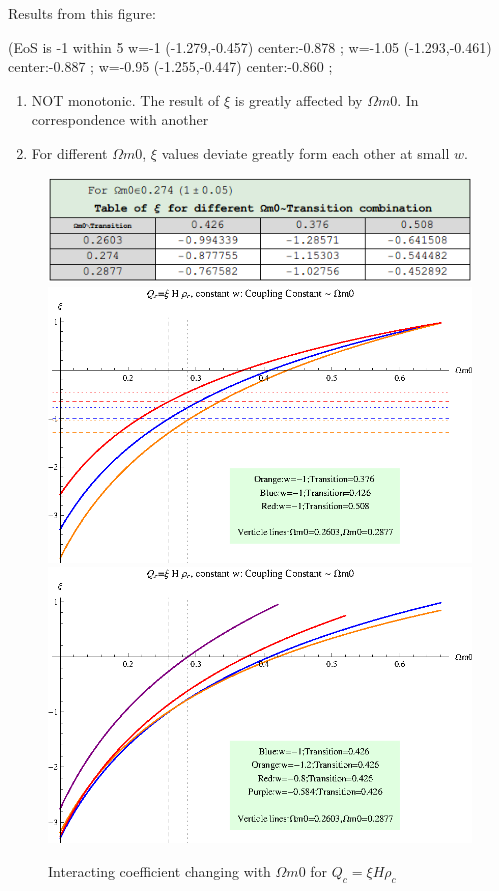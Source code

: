 \documentclass[12pt,a4paper]{article}
\begin{document}
Results from this figure:

(EoS is -1 within 5%
w=-1  (-1.279,-0.457) center:-0.878 ;
w=-1.05  (-1.293,-0.461) center:-0.887 ;
w=-0.95  (-1.255,-0.447) center:-0.860 ;

\begin{enumerate}
\item
NOT monotonic. The result of $\xi$ is greatly affected by $\Omega m0$. In correspondence with another 
\item
For different $\Omega m 0$, $\xi$ values deviate greatly form each other at small $w$.
\end{enumerate}




\begin{figure}[htpb]
\centering
\includegraphics[width=450pt]{rhoc_ICC_table4.png}
\includegraphics[width=350pt]{rhoc_ICC_xiVSOmegam0.eps}
\includegraphics[width=350pt]{rhoc_ICC_xiVSOmegam02.eps}
\caption{Interacting coefficient changing with $\Omega m0$ for $Q_c=\xi H\rho_c$}\label{fig-rhoc_ICC_xiVSOmegam0}
\end{figure}
\end{document}
